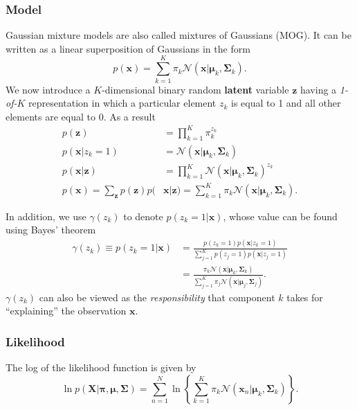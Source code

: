 \documentclass[a4paper]{report}
\renewcommand{\bf}{\mathbf}
\renewcommand{\cal}{\mathcal}
\newcommand{\imp}[1]{{\color{blue}\textit{#1}}}
\newcommand{\bs}{\boldsymbol}
\begin{document}
\subsubsection{Model}
Gaussian mixture models are also called mixtures of Gaussians (MOG). It can be written as a linear superposition of Gaussians in the form
\begin{equation}
	p(\bf{x}) = \sum_{k=1}^K \pi_k \cal{N}(\bf{x}|\bs{\mu}_k,\bs{\Sigma}_k).
\end{equation}
We now introduce a $K$-dimensional binary random \textbf{latent} variable $\bf{z}$ having a \imp{1-of-$K$} representation in which a particular element $z_k$ is equal to 1 and all other elements are equal to 0. As a result
\begin{align}
 p(\bf{z}) &= \prod_{k=1}^{K} \pi_k^{z_k} \\
 p(\bf{x}|z_k=1) &= \cal{N}(\bf{x}|\bs{\mu}_k,\bs{\Sigma}_k) \\
 p(\bf{x|z})&= \prod_{k=1}^K \cal{N}(\bf{x}|\bs{\mu}_k,\bs{\Sigma}_k)^{z_k}\\
 p(\bf{x}) = \sum_{\bf{z}} p(\bf{z})p(&\bf{x|z}) = \sum_{k=1}^K \pi_k \cal{N}(\bf{x}|\bs{\mu}_k,\bs{\Sigma}_k).
\end{align}

In addition, we use $\gamma(z_k)$ to denote $p(z_k=1|\bf{x})$, whose value can be found using Bayes' theorem
\begin{align}
	\gamma(z_k)\equiv p(z_k=1|\bf{x}) &= \frac{p(z_k=1)p(\bf{x}|z_k=1)}{\sum_{j=1}^K p(z_j=1)p(\bf{x}|z_j=1)} \\
	&= \frac{\pi_k \cal{N}(\bf{x}|\bs{\mu}_k,\bs{\Sigma}_k)}{\sum_{j=1}^K \pi_j \cal{N}(\bf{x}|\bs{\mu}_j,\bs{\Sigma}_j)}.
\end{align}
$\gamma(z_k)$ can also be viewed as the \imp{responsibility} that component $k$ takes for ``explaining'' the observation $\bf{x}$.
\subsubsection{Likelihood}
The log of the likelihood function is given by
\begin{equation}
	\ln p(\bf{X}|\bs{\pi,\mu,\Sigma}) = \sum_{n=1}^N \ln \left\{ \sum_{k=1}^K \pi_k \cal{N}(\bf{x}_n|\bs{\mu}_k,\bs{\Sigma}_k) \right\}.
\end{equation}
\end{document}
